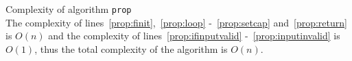 \begin{sepproof}{Complexity of algorithm \texttt{prop}} \ \\
  The complexity of lines~\ref{prop:finit},~\ref{prop:loop} -~\ref{prop:setcap} and~\ref{prop:return} is $O\left(n\right)$ and
  the complexity of lines~\ref{prop:ifinputvalid} -~\ref{prop:inputinvalid} is $O\left(1\right)$, thus the total complexity of
  the algorithm is $O\left(n\right)$.
\end{sepproof}
